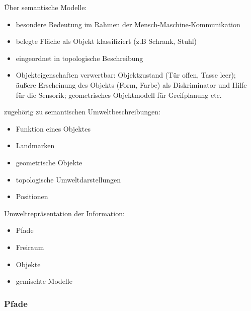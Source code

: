 \begin{description}
Über semantische Modelle:
\begin{itemize}
\item besondere Bedeutung im Rahmen der Mensch-Maschine-Kommunikation
\item belegte Fläche als Objekt klassifiziert (z.B Schrank, Stuhl)
\item eingeordnet in topologische Beschreibung
\item Objekteigenschaften verwertbar: Objektzustand (Tür offen, Tasse leer); äußere Erscheinung des Objekts (Form, Farbe) als Diskriminator und Hilfe für die Sensorik; geometrisches Objektmodell für Greifplanung etc.
\end{itemize}
zugehörig zu semantischen Umweltbeschreibungen:
\begin{itemize}
\item Funktion eines Objektes
\item Landmarken
\item geometrische Objekte
\item topologische Umweltdarstellungen
\item Positionen
\end{itemize}
\end{description}

Umweltrepräsentation der Information:
\begin{itemize}
\item Pfade \item Freiraum \item Objekte \item gemischte Modelle
\end{itemize}

\subsubsection*{Pfade}

